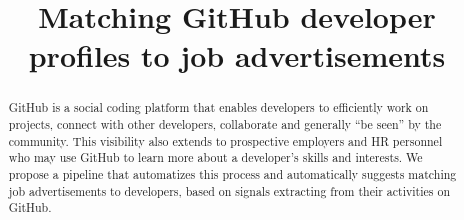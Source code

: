\documentclass[conference]{IEEEtran}
\begin{document}
\newcommand{\ghtorrent}{ \textsc{ght}orrent\xspace}
\newcommand{\api}{\textsc{api}\xspace}

\newcommand{\nb}[3]{
  \fcolorbox{black}{#2}{\bfseries\sffamily\scriptsize#1}
    {\sf\small$\blacktriangleright$\textit{#3}$\blacktriangleleft$}
}

\newcommand\georgios[1]{\nb{Georgios}{yellow}{#1}}
\newcommand\claudia[1]{\nb{Claudia}{cyan}{#1}}
\newcommand\annotate[1]{\hfill \setlength{\fboxsep}{1pt} \colorbox{NavyBlue}{\color{white}[{#1}]}}
\newcommand\annotateG[1]{\hfill \setlength{\fboxsep}{1pt} \colorbox{BrickRed}{\color{white}[{#1}]}}


\newcommand{\hassanbox}[1]
{
  \vspace{0.29em}
  \noindent
  \fbox{
  \begin{minipage}{0.46\textwidth}
    \emph{\noindent #1}
    \end{minipage}
}}

\newcommand{\resp}[2]{{\sc R#1:} ``\emph{#2}''}
\newcommand{\respnum}[1]{{\sc R#1}}
\newcommand{\code}[1]{{\textsl{#1}}}

\title{Matching GitHub developer profiles to job advertisements}

\author{
\and
{}
}

\maketitle

\begin{abstract}
GitHub is a social coding platform that enables developers to efficiently work on projects, connect with other developers, collaborate and generally ``be seen'' by the community. This visibility also extends to prospective employers and HR personnel who may use GitHub to learn more about a developer's skills and interests. We propose a pipeline that automatizes this process and automatically suggests matching job advertisements to developers, based on signals extracting from their activities on GitHub.
\end{abstract}
\end{document}
